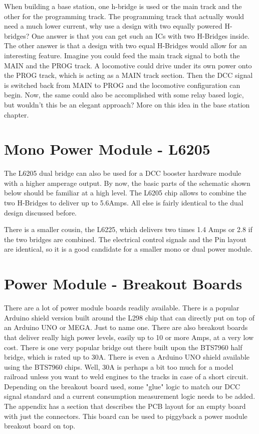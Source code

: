 When building a base station, one h-bridge is used or the main track and the other for the programming track. The programming track that actually would need a much lower current, why use a design with two equally powered H-bridges? One answer is that you can get such an ICs with two H-Bridges inside. The other answer is that a design with two equal H-Bridges would allow for an interesting feature. Imagine you could feed the main track signal to both the MAIN and the PROG track. A locomotive could drive under its own power onto the PROG track, which is acting as a MAIN track section. Then the DCC signal is switched back from MAIN to PROG and the locomotive configuration can begin. Now, the same could also be accomplished with some relay based logic, but wouldn't this be an elegant approach? More on this idea in the base station chapter.

\section{Mono Power Module - L6205}

The L6205 dual bridge can also be used for a DCC booster hardware module with a higher amperage output. By now, the basic parts of the schematic shown below should be familiar at a high level. The L6205 chip allows to combine the two H-Bridges to deliver up to 5.6Amps. All else is fairly identical to the dual design discussed before.


There is a smaller cousin, the L6225, which delivers two times 1.4 Amps or 2.8 if the two bridges are combined. The electrical control signals and the Pin layout are identical, so it is a good candidate for a smaller mono or dual power module.

\section{Power Module - Breakout Boards}

There are a lot of power module boards readily available. There is a popular Arduino shield version built around the L298 chip that can directly put on top of an Arduino UNO or MEGA. Just to name one. There are also breakout boards that deliver really high power levels, easily up to 10 or more Amps, at a very low cost. There is one very popular bridge out there built upon the BTS7960 half bridge, which is rated up to 30A. There is even a Arduino UNO shield available using the BTS7960 chips. Well, 30A is perhaps a bit too much for a model railroad unless you want to weld engines to the tracks in case of a short circuit. Depending on the breakout board used, some "glue" logic to match our DCC signal standard and a current consumption measurement logic needs to be added. The appendix has a section that describes the PCB layout for an empty board with just the connectors. This board can be used to piggyback a power module breakout board on top.

